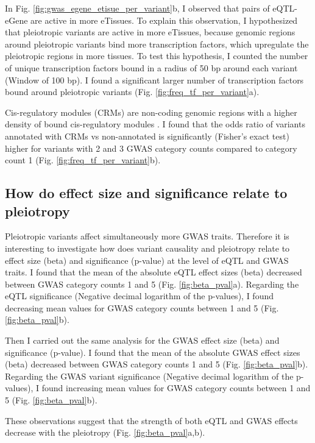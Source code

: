 In Fig. \ref{fig:gwas_egene_etisue_per_variant}b, I observed that pairs of eQTL-eGene are active in more eTissues.
%
To explain this observation, I hypothesized that pleiotropic variants are active in more eTissues, because genomic regions around pleiotropic variants bind more transcription factors, which upregulate the pleiotropic regions in more tissues.
%
To test this hypothesis, I counted the number of unique transcription factors bound in a radius of 50 bp around each variant (Window of 100 bp).
%
I found a significant larger number of transcription factors bound around pleiotropic variants (Fig. \ref{fig:freq_tf_per_variant}a).

Cis-regulatory modules (CRMs) are non-coding genomic regions with a higher density of bound cis-regulatory modules \citep{2021.Ballester.Hammal}.
%
I found that the odds ratio of variants annotated with CRMs vs non-annotated is significantly (Fisher's exact test) higher for variants with 2 and 3 GWAS category counts compared to category count 1 (Fig. \ref{fig:freq_tf_per_variant}b).

\subsection*{How do effect size and significance relate to pleiotropy}

Pleiotropic variants affect simultaneously more GWAS traits.
%
Therefore it is interesting to investigate how does variant causality and pleiotropy relate to effect size (beta) and significance (p-value) at the level of eQTL and GWAS traits.
%
I found that the mean of the absolute eQTL effect sizes (beta) decreased between GWAS category counts 1 and 5 (Fig. \ref{fig:beta_pval}a).
%
Regarding the eQTL significance (Negative decimal logarithm of the p-values), I found decreasing mean values for GWAS category counts between 1 and 5 (Fig. \ref{fig:beta_pval}b).

Then I carried out the same analysis for the GWAS effect size (beta) and significance (p-value).
%
I found that the mean of the absolute GWAS effect sizes (beta) decreased between GWAS category counts 1 and 5 (Fig. \ref{fig:beta_pval}b).
%
Regarding the GWAS variant significance (Negative decimal logarithm of the p-values), I found increasing mean values for GWAS category counts between 1 and 5 (Fig. \ref{fig:beta_pval}b).

These observations suggest that the strength of both eQTL and GWAS effects decrease with the pleiotropy (Fig. \ref{fig:beta_pval}a,b).
